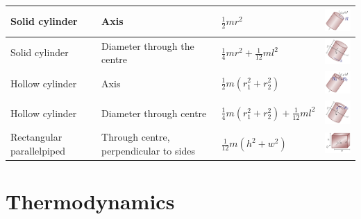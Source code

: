 \documentclass[12pt,a4paper]{article}
\begin{document}
\begin{tabular}{l|llc}
	Solid cylinder & Axis & \( \frac{1}{2} m r^2 \) &\includegraphics[width=2cm]{page0007.pdf}\\
	\hline
	
	Solid cylinder & Diameter through the centre& \( \frac{1}{4}m r^2 + \frac{1}{12}m l^2\) &\includegraphics[width=2cm]{moiSolidSphereDiam.pdf}\\
	\hline
	
	Hollow cylinder & Axis & \( \frac{1}{2}m (r_1^2+ r_2^2) \) &\includegraphics[width=2cm]{page0008.pdf}\\
	\hline
	
	Hollow cylinder & Diameter through centre & \( \frac{1}{4}m (r_1^2+ r_2^2) + \frac{1}{12}ml^2 \) &\includegraphics[width=2cm]{moiHollowSphereDiam.pdf}\\
	\hline
	
	Rectangular parallelpiped & Through centre, perpendicular to sides & \( \frac{1}{12} m (h^2 + w^2) \) &\includegraphics[width=2cm]{parallelpiped.pdf}\\
	
\end{tabular}


	
\section*{Thermodynamics}
\end{document}

